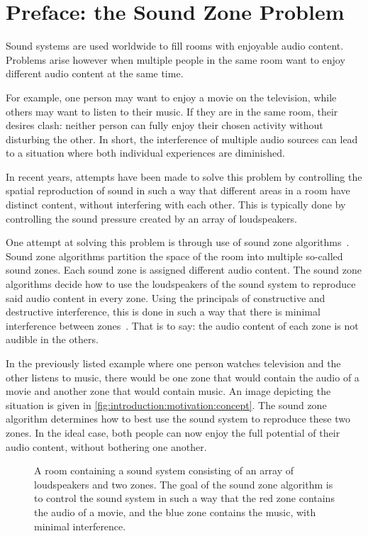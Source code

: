 \section{Preface: the Sound Zone Problem}
\label{ch:introduction:preface}
Sound systems are used worldwide to fill rooms with enjoyable audio content. 
Problems arise however when multiple people in the same room want to enjoy different audio content at the same time.

For example, one person may want to enjoy a movie on the television, while others may want to listen to their music.
If they are in the same room, their desires clash: neither person can fully enjoy their chosen activity without disturbing
the other.
In short, the interference of multiple audio sources can lead to a situation where both individual experiences are diminished.

In recent years, attempts have been made to solve this problem by controlling the spatial reproduction of sound in such
a way that different areas in a room have distinct content, without interfering with each other.
This is typically done by controlling the sound pressure created by an array of loudspeakers.

One attempt at solving this problem is through use of sound zone algorithms~\cite{betlehem2015personal}.
Sound zone algorithms partition the space of the room into multiple so-called sound zones.
Each sound zone is assigned different audio content.
The sound zone algorithms decide how to use the loudspeakers of the sound system to reproduce said audio content in every zone.
Using the principals of constructive and destructive interference, this is done in such a way that there is 
minimal interference between zones~\cite{betlehem2015personal}.
That is to say: the audio content of each zone is not audible in the others.

In the previously listed example where one person watches television and the other listens to music,
there would be one zone that would contain the audio of a movie and another zone that would contain music.
An image depicting the situation is given in \autoref{fig:introduction:motivation:concept}.
The sound zone algorithm determines how to best use the sound system to reproduce these two zones.
In the ideal case, both people can now enjoy the full potential of their audio content, without bothering one another.

\begin{figure}[]
    \centering
    \scalebox{1.0}{}
    \caption{A room containing a sound system consisting of an array of loudspeakers and two zones.
                The goal of the sound zone algorithm is to control the sound system in such a way that the red zone
                contains the audio of a movie, and the blue zone contains the music, with minimal interference.}
    \label{fig:introduction:motivation:concept}
\end{figure}

